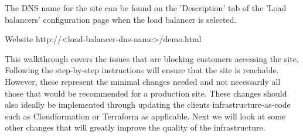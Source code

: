 \FloatBarrier


The DNS name for the site can be found on the 'Description' tab of the 'Load balancers' configuration page when the load balancer is selected.

\internet
{Website}
{http://<load-balancer-dns-name>/demo.html}




\FloatBarrier


This walkthrough covers the issues that are blocking customers accessing the site. Following the step-by-step instructions will ensure that the site is reachable. However, these represent the minimal changes needed and not necessarily all those that would be recommended for a production site. These changes should also ideally be implemented through updating the clients infrastructure-as-code such as Cloudformation or Terraform as applicable. Next we will look at some other changes that will greatly improve the quality of the infrastructure.
